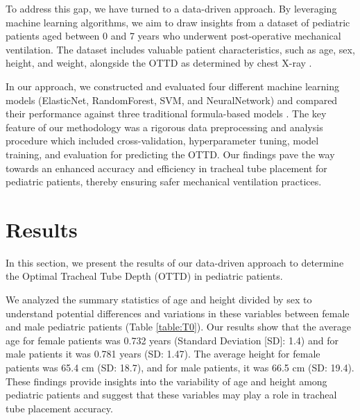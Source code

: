 \documentclass[11pt]{article}
\begin{document}
To address this gap, we have turned to a data-driven approach. By leveraging machine learning algorithms, we aim to draw insights from a dataset of pediatric patients aged between 0 and 7 years who underwent post-operative mechanical ventilation. The dataset includes valuable patient characteristics, such as age, sex, height, and weight, alongside the OTTD as determined by chest X-ray \cite{Ingelse2017EarlyFO, Steurer2018AlteredMI}.

In our approach, we constructed and evaluated four different machine learning models (ElasticNet, RandomForest, SVM, and NeuralNetwork) and compared their performance against three traditional formula-based models \cite{Narula2018EnteralNT,Parkin1987SoilMA}. The key feature of our methodology was a rigorous data preprocessing and analysis procedure which included cross-validation, hyperparameter tuning, model training, and evaluation for predicting the OTTD. Our findings pave the way towards an enhanced accuracy and efficiency in tracheal tube placement for pediatric patients, thereby ensuring safer mechanical ventilation practices.

\section*{Results}

In this section, we present the results of our data-driven approach to determine the Optimal Tracheal Tube Depth (OTTD) in pediatric patients.

We analyzed the summary statistics of age and height divided by sex to understand potential differences and variations in these variables between female and male pediatric patients (Table \ref{table:T0}). Our results show that the average age for female patients was 0.732 years (Standard Deviation [SD]: 1.4) and for male patients it was 0.781 years (SD: 1.47). The average height for female patients was 65.4 cm (SD: 18.7), and for male patients, it was 66.5 cm (SD: 19.4). These findings provide insights into the variability of age and height among pediatric patients and suggest that these variables may play a role in tracheal tube placement accuracy.
\end{document}
